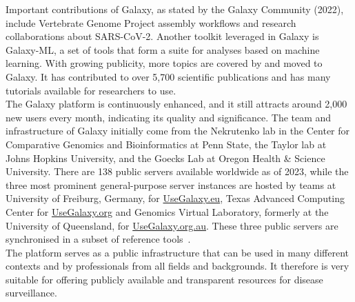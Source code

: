 Important contributions of Galaxy, as stated by the Galaxy Community (2022), include Vertebrate Genome Project assembly workflows and research collaborations about \ac{SARS-CoV-2}. Another toolkit leveraged in Galaxy is Galaxy-ML, a set of tools that form a suite for analyses based on machine learning. With growing publicity, more topics are covered by and moved to Galaxy. It has contributed to over 5,700 scientific publications and has many tutorials available for researchers to use. \\
The Galaxy platform is continuously enhanced, and it still attracts around 2,000 new users every month, indicating its quality and significance. The team and infrastructure of Galaxy initially come from the Nekrutenko lab in the Center for Comparative Genomics and Bioinformatics at Penn State, the Taylor lab at Johns Hopkins University, and the Goecks Lab at Oregon Health \& Science University. There are 138 public servers available worldwide as of 2023, while the three most prominent general-purpose server instances are hosted by teams at University of Freiburg, Germany, for \href{https://usegalaxy.eu/}{UseGalaxy.eu}, Texas Advanced Computing Center for \href{https://usegalaxy.org/}{UseGalaxy.org} and Genomics Virtual Laboratory, formerly at the University of Queensland, for \href{https://usegalaxy.org.au/}{UseGalaxy.org.au}. These three public servers are synchronised in a subset of reference tools~\cite{10.1093/nar/gkac247}. \\
The platform serves as a public infrastructure that can be used in many different contexts and by professionals from all fields and backgrounds. It therefore is very suitable for offering publicly available and transparent resources for disease surveillance.

